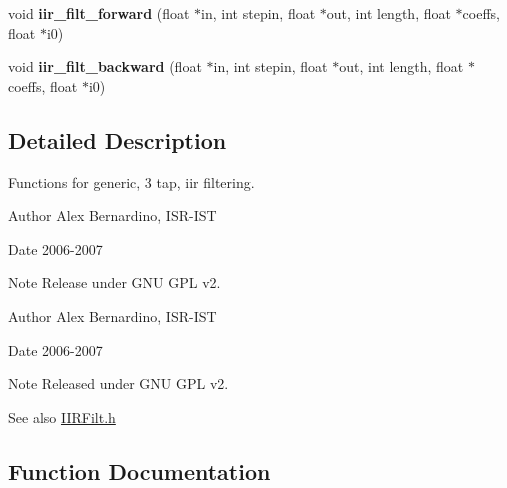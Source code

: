 \begin{DoxyCompactItemize}
\item 
void {\bfseries iir\+\_\+filt\+\_\+forward} (float $\ast$in, int stepin, float $\ast$out, int length, float $\ast$coeffs, float $\ast$i0)\label{IIRFilt_8h_a8363f3ebd3b1b38111c8b4fc2bf3c3d7}

\item 
void {\bfseries iir\+\_\+filt\+\_\+backward} (float $\ast$in, int stepin, float $\ast$out, int length, float $\ast$coeffs, float $\ast$i0)\label{IIRFilt_8h_abf2616f9930b7d91f28f0c6323e5f972}

\end{DoxyCompactItemize}


\subsection{Detailed Description}
Functions for generic, 3 tap, iir filtering. 

\begin{DoxyAuthor}{Author}
Alex Bernardino, I\+S\+R-\/\+I\+ST 
\end{DoxyAuthor}
\begin{DoxyDate}{Date}
2006-\/2007 
\end{DoxyDate}
\begin{DoxyNote}{Note}
Release under G\+NU G\+PL v2.
\end{DoxyNote}
\begin{DoxyAuthor}{Author}
Alex Bernardino, I\+S\+R-\/\+I\+ST 
\end{DoxyAuthor}
\begin{DoxyDate}{Date}
2006-\/2007 
\end{DoxyDate}
\begin{DoxyNote}{Note}
Released under G\+NU G\+PL v2. 
\end{DoxyNote}
\begin{DoxySeeAlso}{See also}
\hyperlink{IIRFilt_8h}{I\+I\+R\+Filt.\+h} 
\end{DoxySeeAlso}


\subsection{Function Documentation}
